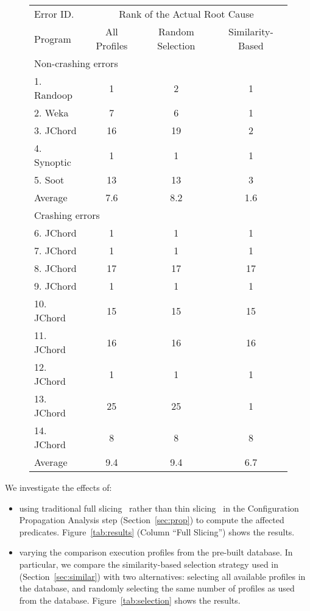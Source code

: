 \begin{figure}[t]
\setlength{\tabcolsep}{.74\tabcolsep}
\small{
\begin{tabular}{|l|c|c||c|}
\hline
 Error ID. & \multicolumn{3}{|c|}{Rank of the Actual Root Cause} \\
\cline{2-4}
 Program & All Profiles& Random Selection&  Similarity-Based\\
 \hline
\hline
\multicolumn{4}{|l|}{Non-crashing errors}   \\
 \hline
 1. Randoop & 1 & 2 & 1\\
 2. Weka & 7 & 6 & 1\\
 3. JChord & 16 & 19 & 2\\
 4. Synoptic & 1 & 1 & 1\\
 5. Soot & 13 & 13 & 3\\
\hline
Average & 7.6 & 8.2 & 1.6 \\
\hline
\hline
\multicolumn{4}{|l|}{Crashing errors}   \\
\hline
 6. JChord & 1 & 1 &1\\
 7. JChord & 1 & 1 &1\\
 8. JChord & 17 & 17 &17\\
 9. JChord & 1 &  1&1\\
 10. JChord & 15 & 15 &15\\
 11. JChord & 16 & 16 &16\\
 12. JChord & 1 & 1 &1\\
 13. JChord & 25 & 25 &1\\
 14. JChord & 8 & 8 &8\\
\hline
Average & 9.4 & 9.4 & 6.7\\
\hline
\end{tabular}
}
\end{figure}

We investigate the effects of:

\begin{itemize}
\item using traditional full slicing~\cite{Horwitz:1988} rather
than thin slicing~\cite{Sridharan:2007} in the Configuration
Propagation Analysis step (Section~\ref{sec:prop}) to compute the affected predicates.
Figure~\ref{tab:results}  (Column ``Full Slicing'') shows the results.
\item varying the comparison execution profiles from the pre-built database.
In particular, we compare the similarity-based selection strategy used in \ourtool
 (Section~\ref{sec:similar}) with two alternatives: selecting
all available profiles in the database, and
randomly selecting the same number of profiles as \ourtool used from the database.
Figure~\ref{tab:selection} shows the results.
\end{itemize}



